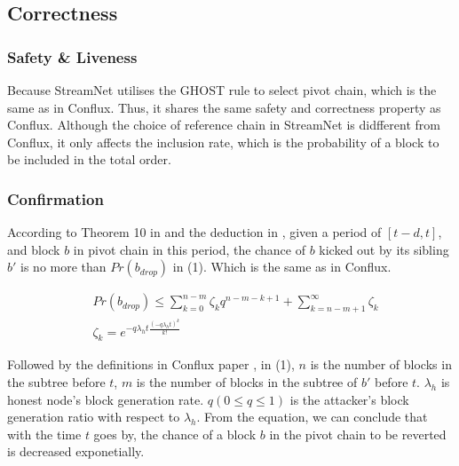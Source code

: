 \subsection{Correctness}

\subsubsection{Safety \& Liveness}
Because StreamNet utilises the GHOST rule to select pivot chain, which is the same as in Conflux. 
Thus, it shares the same safety and correctness property as Conflux.
Although the choice of reference chain in StreamNet is didfferent from Conflux, it only affects the inclusion rate,
which is the probability of a block to be included in the total order.

\subsubsection{Confirmation}

According to Theorem 10 in \cite{sompolinsky2015secure} and the deduction in \cite{li2018scaling}, 
given a period of $[t-d, t]$, and block $b$ in pivot chain in this period, 
the chance of $b$ kicked out by its sibling $b'$ is no more than $Pr(b_{drop})$ in (1).
Which is the same as in Conflux.

\begin{equation}
    \begin{flalign*}
        & Pr(b_{drop}) \leq \sum_{k=0}^{n-m}{\zeta_kq^{n-m-k+1}} + \sum_{k=n-m+1}^{\infty}{\zeta_k} \\
        & \zeta_k = e^{-q\lambda_{h}t \frac{(-q\lambda_{h}t)^k}{k!}}
    \end{flalign*}
\end{equation}

Followed by the definitions in Conflux paper \cite{li2018scaling}, 
in (1), $n$ is the number of blocks in the subtree before $t$, 
$m$ is the number of blocks in the subtree of $b'$ before $t$. 
$\lambda_{h}$ is honest node's block generation rate.
$q (0 \leq q \leq 1)$ is the attacker's block generation ratio with respect to $\lambda_{h}$.
From the equation, we can conclude that with the time $t$ goes by, 
the chance of a block $b$ in the pivot chain to be reverted is decreased exponetially.
